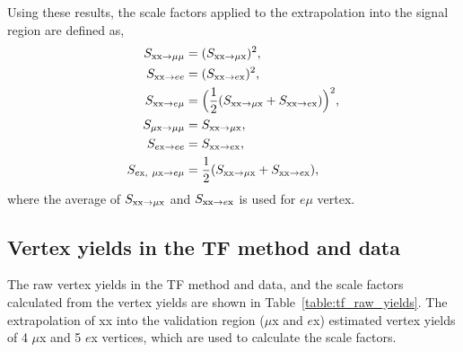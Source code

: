 Using these results, the scale factors applied to the extrapolation into the signal region are defined as,
\begin{align}
\label{eq:TF_scale_factors}
S_{\mathrm{xx}\rightarrow \mu\mu}  &=  (S_{\mathrm{xx}\rightarrow \mu \mathrm{x}} )^{2},  \nonumber\\
S_{\mathrm{xx}\rightarrow ee}  &= (S_{\mathrm{xx}\rightarrow e \mathrm{x}} )^{2},  \nonumber\\
S_{\mathrm{xx}\rightarrow e\mu}  &= \Big(\frac{1}{2} (S_{\mathrm{xx}\rightarrow \mu \mathrm{x}}  + S_{\mathrm{xx}\rightarrow e \mathrm{x}} )\Big)^{2}, \nonumber\\
S_{\mu \mathrm{x}\rightarrow \mu\mu}  &=  S_{\mathrm{xx}\rightarrow \mu \mathrm{x}} ,  \nonumber\\
S_{e \mathrm{x}\rightarrow ee}  &= S_{\mathrm{xx}\rightarrow e \mathrm{x}} ,  \nonumber\\
S_{e \mathrm{x},~\mu \mathrm{x} \rightarrow e\mu}  &= \frac{1}{2} (S_{\mathrm{xx}\rightarrow \mu \mathrm{x}}  + S_{\mathrm{xx}\rightarrow e \mathrm{x}} ),
\end{align}
where the average of $S_{\mathrm{xx}\rightarrow \mu \mathrm{x}} $ and $S_{\mathrm{xx}\rightarrow e \mathrm{x}} $ is used for $e \mu$ vertex.



\subsection{Vertex yields in the TF method and data}
\label{sec:tf_raw_yields}
The raw vertex yields in the TF method and data, and the scale factors calculated from the vertex yields are shown in Table~\ref{table:tf_raw_yields}. The extrapolation of xx into the validation region ($\mu$x and $e$x) estimated vertex yields of 4 $\mu$x and 5 $e$x vertices, which are used to calculate the scale factors.

\begin{table}[!htb]%
  \centering
  \qquad
  \caption{(a) Vertex yields in the TF and data. Also shown is (b) the scale factors calculated from the vetex yields}
  \label{table:tf_raw_yields}
\end{table}


